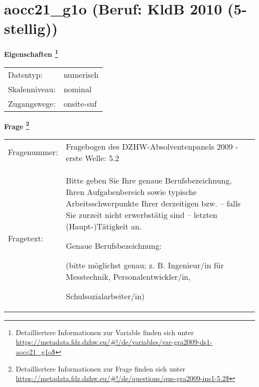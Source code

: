 
    \setcounter{footnote}{0}

    \vspace*{-1.8cm}
	\section{aocc21\_g1o (Beruf: KldB 2010 (5-stellig))}
	\label{section:aocc21_g1o}



    \vspace*{0.5cm}
    \noindent\textbf{Eigenschaften
	\footnote{Detailliertere Informationen zur Variable finden sich unter
		\url{https://metadata.fdz.dzhw.eu/\#!/de/variables/var-gra2009-ds1-aocc21_g1o$}}}\\
	\begin{tabularx}{\hsize}{@{}lX}
	Datentyp: & numerisch \\
	Skalenniveau: & nominal \\
	Zugangswege: &
	  onsite-suf
 \\
    \end{tabularx}



				\vspace*{0.5cm}
                \noindent\textbf{Frage
	                \footnote{Detailliertere Informationen zur Frage finden sich unter
		              \url{https://metadata.fdz.dzhw.eu/\#!/de/questions/que-gra2009-ins1-5.2$}}}\\
				\begin{tabularx}{\hsize}{@{}lX}
					Fragenummer: &
					  Fragebogen des DZHW-Absolventenpanels 2009 - erste Welle:
					  5.2
 \\
					Fragetext: & Bitte geben Sie Ihre genaue Berufsbezeichnung, Ihren Aufgabenbereich sowie typische Arbeitsschwerpunkte Ihrer derzeitigen bzw. – falls Sie zurzeit nicht erwerbstätig sind – letzten (Haupt-)Tätigkeit an.\par  Genaue Berufsbezeichnung:\par  (bitte möglichst genau; z. B. Ingenieur/in für Messtechnik, Personalentwickler/in,\par  Schulsozialarbeiter/in) \\
				\end{tabularx}





